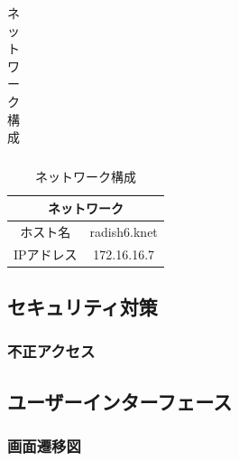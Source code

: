 \documentclass[a4paper]{ltjsarticle}
\begin{document}
\begin{table}[h]
\begin{minipage}[t]{.39\textwidth}
\begin{tabular}{|c||c|}
                \end{tabular}
                \hspace{1\textwidth}
                \caption{ネットワーク構成}
                \label{tab:network}
                \begin{tabular}{|c||c|}
                    \hline
                    \multicolumn{2}{|c|}{ネットワーク} \\ \hline \hline
                    ホスト名 & radish6.knet \\ \hline
                    IPアドレス & 172.16.16.7 \\ \hline
                \end{tabular}
            \end{minipage}
        \end{table}

\subsection{セキュリティ対策}
    \subsubsection{不正アクセス}

\subsection{ユーザーインターフェース}
    \subsubsection{画面遷移図}
\end{document}
